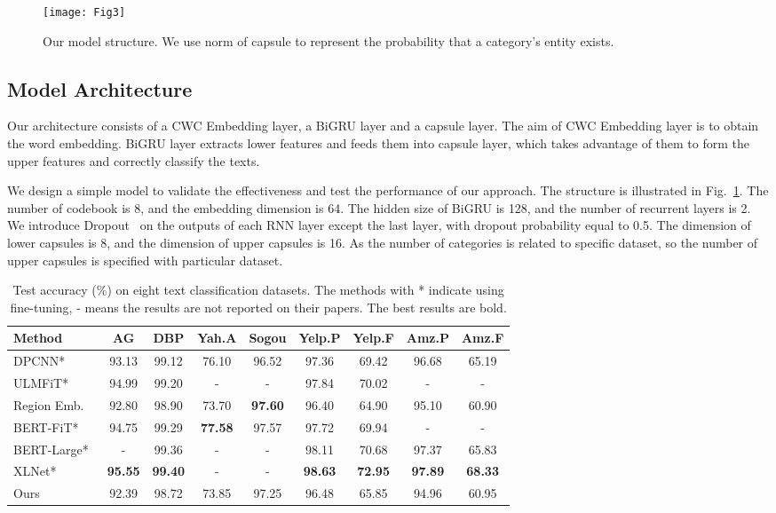 \documentclass[times,twocolumn,final]{elsarticle}
\begin{document}
\begin{figure}
  \centering
  \texttt{[image: Fig3]}
  \caption{Our model structure. We use  norm of capsule to represent the probability that a category's entity exists.}
  \label{model_structure}
\end{figure}

\subsection{Model Architecture}

Our architecture consists of a CWC Embedding layer, a BiGRU layer and a capsule layer. The aim of CWC Embedding layer is to obtain the word embedding. BiGRU layer extracts lower features and feeds them into capsule layer, which takes advantage of them to form the upper features and correctly classify the texts.

We design a simple model to validate the effectiveness and test the performance of our approach. The structure is illustrated in Fig.~\ref{model_structure}. The number of codebook is 8, and the embedding dimension is 64. The hidden size of BiGRU is 128, and the number of recurrent layers is 2. We introduce Dropout~\cite{hinton2012improving} on the outputs of each RNN layer except the last layer, with dropout probability equal to 0.5. The dimension of lower capsules is 8, and the dimension of upper capsules is 16. As the number of categories is related to specific dataset, so the number of upper capsules is specified with particular dataset.

\begin{table*}
  \centering
  \caption{Test accuracy (\%) on eight text classification datasets. The methods with * indicate using fine-tuning, - means the results are not reported on their papers. The best results are bold.}
  \label{table:sota}
  \begin{tabular}{l|cccccccc}
    \toprule
    Method  & AG  & DBP  & Yah.A  & Sogou  & Yelp.P  & Yelp.F & Amz.P  & Amz.F \\
    \midrule
    DPCNN*~\cite{johnson2017deep}    & 93.13  & 99.12  & 76.10 & 96.52  & 97.36  & 69.42 & 96.68 & 65.19 \\
    ULMFiT*~\cite{howard2018universal}    & 94.99  & 99.20  & - & -  & 97.84  & 70.02 & - & - \\
    Region Emb.~\cite{qiao2018new}    & 92.80  & 98.90  & 73.70 & \textbf{97.60}  & 96.40  & 64.90 & 95.10 & 60.90 \\
    BERT-FiT*~\cite{sun2019fine}    & 94.75  & 99.29  & \textbf{77.58} & 97.57  & 97.72  & 69.94 & - & - \\
    BERT-Large*~\cite{xie2020unsupervised}    & -  & 99.36  & - & -  & 98.11  & 70.68 & 97.37 & 65.83 \\
    XLNet*~\cite{yang2019xlnet}    & \textbf{95.55}  & \textbf{99.40}  & - & -  & \textbf{98.63}  & \textbf{72.95} & \textbf{97.89} & \textbf{68.33} \\
    \midrule
    Ours    & 92.39         & 98.72       & 73.85      & 97.25   & 96.48  & 65.85 & 94.96 & 60.95 \\
    \bottomrule
  \end{tabular}
\end{table*}
\end{document}
